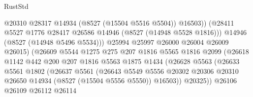 \begin{lexlean}{RustStd}
\begin{coremodule}
                                      @20310
                                      @28317
                                      @14934
                                      (@8527 (@15504 @5516 @5504))
                                      @16503))
                                  (@28411
                                    @5527
                                    @1776
                                    @28417
                                    @26586
                                    @14946
                                    (@8527 (@14948 @5528 @1816)))
                                  @14946
                                  (@8527 (@14948 @5496 @5534)))
                                @25994
                                @25997
                                @26000
                                @26004
                                @26009
                                @26015)
                              (@26609
                                @5544
                                @1275
                                @275
                                @207
                                @1816
                                @5565
                                @1816
                                @2099
                                (@26618
                                  @1142
                                  @442
                                  @200
                                  @207
                                  @1816
                                  @5563
                                  @1875
                                  @1434
                                  (@26628
                                    @5563
                                    (@26633
                                      @5561
                                      @1802
                                      (@26637
                                        @5561
                                        (@26643
                                          @5549
                                          @5556
                                          @20302
                                          @20306
                                          @20310
                                          @26650
                                          @14934
                                          (@8527 (@15504 @5556 @5550))
                                          @16503))
                                      @20325))
                                  @26106
                                  @26109
                                  @26112
                                  @26114

\end{coremodule}
\end{lexlean}
